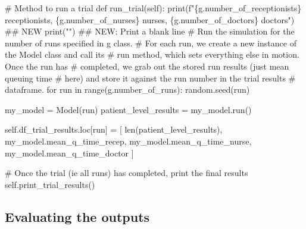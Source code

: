 \documentclass[
  letterpaper,
  DIV=11,
  numbers=noendperiod]{scrreprt}
\newenvironment{Shaded}{\begin{snugshade}}{\end{snugshade}}
\newcommand{\BuiltInTok}[1]{\textcolor[rgb]{0.00,0.23,0.31}{#1}}
\newcommand{\CommentTok}[1]{\textcolor[rgb]{0.37,0.37,0.37}{#1}}
\newcommand{\ControlFlowTok}[1]{\textcolor[rgb]{0.00,0.23,0.31}{#1}}
\newcommand{\KeywordTok}[1]{\textcolor[rgb]{0.00,0.23,0.31}{#1}}
\newcommand{\NormalTok}[1]{\textcolor[rgb]{0.00,0.23,0.31}{#1}}
\newcommand{\OperatorTok}[1]{\textcolor[rgb]{0.37,0.37,0.37}{#1}}
\newcommand{\SpecialCharTok}[1]{\textcolor[rgb]{0.37,0.37,0.37}{#1}}
\newcommand{\SpecialStringTok}[1]{\textcolor[rgb]{0.13,0.47,0.30}{#1}}
\newcommand{\StringTok}[1]{\textcolor[rgb]{0.13,0.47,0.30}{#1}}
\newcommand{\VariableTok}[1]{\textcolor[rgb]{0.07,0.07,0.07}{#1}}
\begin{document}
\begin{tcolorbox}
\begin{Shaded}
\begin{Highlighting}[]
    \CommentTok{\# Method to run a trial}
    \KeywordTok{def}\NormalTok{ run\_trial(}\VariableTok{self}\NormalTok{):}
        \BuiltInTok{print}\NormalTok{(}\SpecialStringTok{f"}\SpecialCharTok{\{}\NormalTok{g}\SpecialCharTok{.}\NormalTok{number\_of\_receptionists}\SpecialCharTok{\}}\SpecialStringTok{ receptionists, }\SpecialCharTok{\{}\NormalTok{g}\SpecialCharTok{.}\NormalTok{number\_of\_nurses}\SpecialCharTok{\}}\SpecialStringTok{ nurses, }\SpecialCharTok{\{}\NormalTok{g}\SpecialCharTok{.}\NormalTok{number\_of\_doctors}\SpecialCharTok{\}}\SpecialStringTok{ doctors"}\NormalTok{) }\CommentTok{\#\# NEW}
        \BuiltInTok{print}\NormalTok{(}\StringTok{""}\NormalTok{) }\CommentTok{\#\# NEW: Print a blank line}
        \CommentTok{\# Run the simulation for the number of runs specified in g class.}
        \CommentTok{\# For each run, we create a new instance of the Model class and call its}
        \CommentTok{\# run method, which sets everything else in motion.  Once the run has}
        \CommentTok{\# completed, we grab out the stored run results (just mean queuing time}
        \CommentTok{\# here) and store it against the run number in the trial results}
        \CommentTok{\# dataframe.}
        \ControlFlowTok{for}\NormalTok{ run }\KeywordTok{in} \BuiltInTok{range}\NormalTok{(g.number\_of\_runs):}
\NormalTok{            random.seed(run)}

\NormalTok{            my\_model }\OperatorTok{=}\NormalTok{ Model(run)}
\NormalTok{            patient\_level\_results }\OperatorTok{=}\NormalTok{ my\_model.run()}

            \VariableTok{self}\NormalTok{.df\_trial\_results.loc[run] }\OperatorTok{=}\NormalTok{ [}
                \BuiltInTok{len}\NormalTok{(patient\_level\_results),}
\NormalTok{                my\_model.mean\_q\_time\_recep,}
\NormalTok{                my\_model.mean\_q\_time\_nurse,}
\NormalTok{                my\_model.mean\_q\_time\_doctor}
\NormalTok{                ]}

        \CommentTok{\# Once the trial (ie all runs) has completed, print the final results}
        \VariableTok{self}\NormalTok{.print\_trial\_results()}
\end{Highlighting}
\end{Shaded}

\end{tcolorbox}

\subsection{Evaluating the outputs}\label{evaluating-the-outputs-4}
\end{document}
